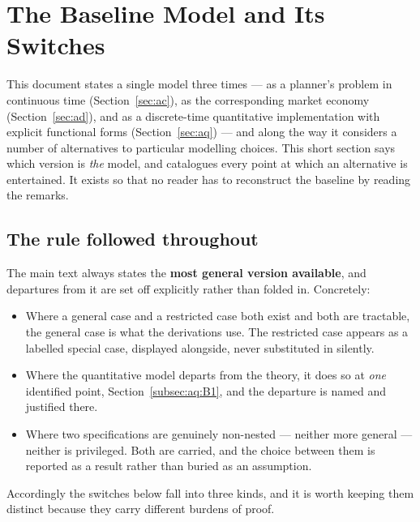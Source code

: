 
\section{The Baseline Model and Its Switches}
\label{sec:baseline}

This document states a single model three times --- as a planner's problem in continuous time (Section~\ref{sec:ac}), as the corresponding market economy (Section~\ref{sec:ad}), and as a discrete-time quantitative implementation with explicit functional forms (Section~\ref{sec:aq}) --- and along the way it considers a number of alternatives to particular modelling choices. This short section says which version is \emph{the} model, and catalogues every point at which an alternative is entertained. It exists so that no reader has to reconstruct the baseline by reading the remarks.

\subsection{The rule followed throughout}
\label{subsec:baseline:rule}

The main text always states the \textbf{most general version available}, and departures from it are set off explicitly rather than folded in. Concretely:

\begin{itemize}[leftmargin=1.6em,itemsep=0.25em]
\item Where a general case and a restricted case both exist and both are tractable, the general case is what the derivations use. The restricted case appears as a labelled special case, displayed alongside, never substituted in silently.
\item Where the quantitative model departs from the theory, it does so at \emph{one} identified point, Section~\ref{subsec:aq:B1}, and the departure is named and justified there.
\item Where two specifications are genuinely non-nested --- neither more general --- neither is privileged. Both are carried, and the choice between them is reported as a result rather than buried as an assumption.
\end{itemize}

Accordingly the switches below fall into three kinds, and it is worth keeping them distinct because they carry different burdens of proof.

